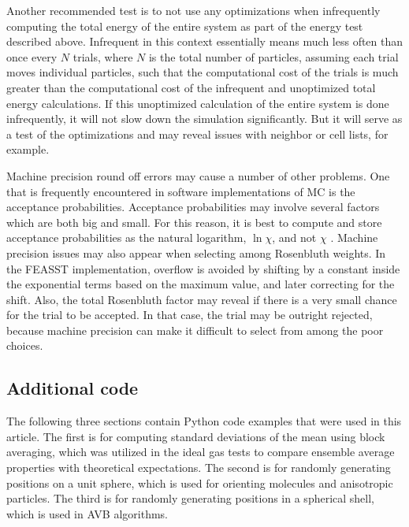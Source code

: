 Another recommended test is to not use any optimizations when infrequently computing the total energy of the entire system as part of the energy test described above.
Infrequent in this context essentially means much less often than once every $N$ trials, where $N$ is the total number of particles, assuming each trial moves individual particles, such that the computational cost of the trials is much greater than the computational cost of the infrequent and unoptimized total energy calculations.
If this unoptimized calculation of the entire system is done infrequently, it will not slow down the simulation significantly.
But it will serve as a test of the optimizations and may reveal issues with neighbor or cell lists, for example.

Machine precision round off errors may cause a number of other problems.
One that is frequently encountered in software implementations of MC is the acceptance probabilities.
Acceptance probabilities may involve several factors which are both big and small.
For this reason, it is best to compute and store acceptance probabilities as the natural logarithm, $\ln\chi$, and not $\chi$ \cite{shah_cassandra_2017}.
Machine precision issues may also appear when selecting among Rosenbluth weights.
In the FEASST \cite{hatch_monte_2024} implementation, overflow is avoided by shifting by a constant inside the exponential terms based on the maximum value, and later correcting for the shift.
Also, the total Rosenbluth factor may reveal if there is a very small chance for the trial to be accepted.
In that case, the trial may be outright rejected, because machine precision can make it difficult to select from among the poor choices.

\subsection{\label{sec:code}Additional code}

The following three sections contain Python code examples that were used in this article.
The first is for computing standard deviations of the mean using block averaging, which was utilized in the ideal gas tests to compare ensemble average properties with theoretical expectations.
The second is for randomly generating positions on a unit sphere, which is used for orienting molecules and anisotropic particles.
The third is for randomly generating positions in a spherical shell, which is used in AVB algorithms.

